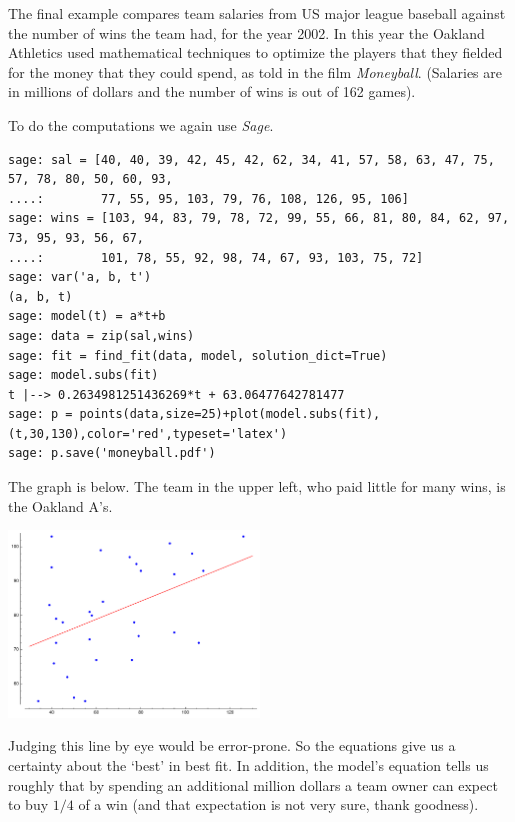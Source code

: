 The final example
compares team salaries from US major league baseball 
against the number of wins the team had, for the year 2002.
In this year the Oakland Athletics 
used mathematical techniques to optimize the players that they fielded
for the money that they could spend, as told in  
the film \textit{Moneyball}.
(Salaries are in millions of dollars and the number of wins
is out of 162 games). 

To do the computations we again use \textit{Sage}. 
\begin{lstlisting}
sage: sal = [40, 40, 39, 42, 45, 42, 62, 34, 41, 57, 58, 63, 47, 75, 57, 78, 80, 50, 60, 93,
....:        77, 55, 95, 103, 79, 76, 108, 126, 95, 106]
sage: wins = [103, 94, 83, 79, 78, 72, 99, 55, 66, 81, 80, 84, 62, 97, 73, 95, 93, 56, 67,
....:        101, 78, 55, 92, 98, 74, 67, 93, 103, 75, 72]
sage: var('a, b, t')
(a, b, t)
sage: model(t) = a*t+b
sage: data = zip(sal,wins)
sage: fit = find_fit(data, model, solution_dict=True)
sage: model.subs(fit)
t |--> 0.2634981251436269*t + 63.06477642781477
sage: p = points(data,size=25)+plot(model.subs(fit),(t,30,130),color='red',typeset='latex')
sage: p.save('moneyball.pdf')
\end{lstlisting}

The graph is below.
The team in the upper left, who paid little for many wins, is
the Oakland A's.

\begin{center}  \small
  \includegraphics[width=0.5\textwidth]{moneyball.pdf}
\end{center}

Judging this line by eye would be error-prone.
So the equations give us a certainty about the `best' in best fit.
In addition, the model's equation tells us roughly that 
by spending an additional million dollars
a team owner can expect to buy $1/4$ of a win
(and that expectation is not very sure, thank goodness).


